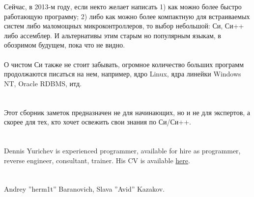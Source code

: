 \documentclass[11pt,a4paper,oneside]{book}
\begin{document}
Сейчас, в 2013-м году, если некто желает написать 1) как можно более быстро работающую программу; 2) либо как
можно более компактную для встраиваемых систем либо маломощных микроконтроллеров, то выбор небольшой:
Си, Си++ либо ассемблер. И альтернативы этим старым но популярным языкам, в обозримом будущем, 
пока что не видно. \\
\\
О чистом Си также не стоит забывать, огромное количество больших программ продолжаются писаться на нем, 
например, ядро Linux, ядра линейки Windows NT, Oracle RDBMS, итд.

\chapter{}

Этот сборник заметок предназначен не для начинающих, но и не для экспертов, а скорее для тех, 
кто хочет освежить свои знания по Си/Си++.

\chapter{}

{Dennis Yurichev is experienced programmer, available for hire as programmer, reverse engineer, consultant, trainer. 
His CV is available \href{http://yurichev.com/Dennis_Yurichev.pdf}{here}.}

\chapter{}

{Andrey ''herm1t'' Baranovich, Slava ''Avid'' Kazakov}.

\mainmatter






















%


\clearpage
\printindex
\end{document}
